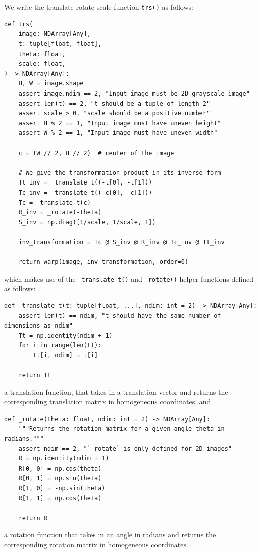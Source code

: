 \section{} %

\subsection{} %

We write the translate-rotate-scale function \lstinline{trs()} as follows:

\begin{lstlisting}
def trs(
    image: NDArray[Any],
    t: tuple[float, float],
    theta: float,
    scale: float,
) -> NDArray[Any]:
    H, W = image.shape
    assert image.ndim == 2, "Input image must be 2D grayscale image"
    assert len(t) == 2, "t should be a tuple of length 2"
    assert scale > 0, "scale should be a positive number"
    assert H % 2 == 1, "Input image must have uneven height"
    assert W % 2 == 1, "Input image must have uneven width"
    
    c = (W // 2, H // 2)  # center of the image

    # We give the transformation product in its inverse form
    Tt_inv = _translate_t((-t[0], -t[1]))
    Tc_inv = _translate_t((-c[0], -c[1]))
	Tc = _translate_t(c)
    R_inv = _rotate(-theta)
    S_inv = np.diag([1/scale, 1/scale, 1])

    inv_transformation = Tc @ S_inv @ R_inv @ Tc_inv @ Tt_inv

    return warp(image, inv_transformation, order=0)
\end{lstlisting}
which makes use of the \lstinline{_translate_t()} and \lstinline{_rotate()} helper functions defined as follows:

\begin{lstlisting}
def _translate_t(t: tuple[float, ...], ndim: int = 2) -> NDArray[Any]:
    assert len(t) == ndim, "t should have the same number of dimensions as ndim"
    Tt = np.identity(ndim + 1)
    for i in range(len(t)):
        Tt[i, ndim] = t[i]

    return Tt
\end{lstlisting}
a translation function, that takes in a translation vector and returns the corresponding translation matrix
in homogeneous coordinates, and
\begin{lstlisting}
def _rotate(theta: float, ndim: int = 2) -> NDArray[Any]:
    """Returns the rotation matrix for a given angle theta in radians."""
    assert ndim == 2, "`_rotate` is only defined for 2D images"
    R = np.identity(ndim + 1)
    R[0, 0] = np.cos(theta)
    R[0, 1] = np.sin(theta)
    R[1, 0] = -np.sin(theta)
    R[1, 1] = np.cos(theta)

    return R
\end{lstlisting}
a rotation function that takes in an angle in radians and returns the corresponding rotation matrix in homogeneous coordinates.

